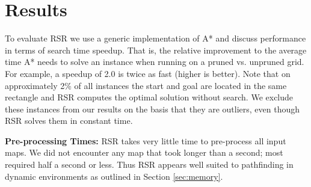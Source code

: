 \section{Results}
\label{sec-results}
To evaluate RSR we use a generic implementation of A* and discuss performance 
in terms of search time speedup. That is, the relative improvement to the average 
time A* needs to solve an instance when running on a pruned  vs. unpruned grid.
For example, a speedup of 2.0 is twice as fast (higher is better).
%
Note that on approximately 2\% of all instances the start and goal are located
in the same rectangle and RSR computes the optimal solution without
search.  We exclude these instances from our results on the basis that they are 
outliers, even though RSR solves them in constant time.



\textbf{Pre-processing Times: } 
RSR takes very little time to pre-process all input maps. 
We did not encounter any map that took longer than a second; most required 
half a second or less.
Thus RSR appears well suited to
pathfinding in dynamic environments as outlined in Section \ref{sec:memory}.

